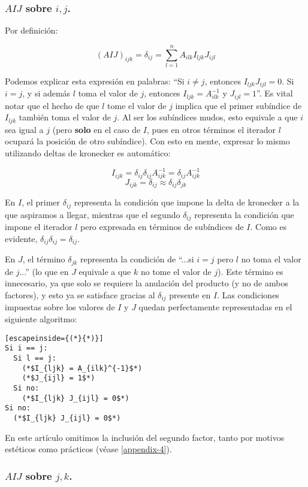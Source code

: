 \subsubsection{$AIJ$ sobre $i, j$.}

Por definición:

$$(AIJ)_{ijk} = \delta_{ij} = \sum\limits^{n}_{l = 1} A_{ilk} I_{ljk} J_{ijl}$$

Podemos explicar esta expresión en palabras: ``Si $i \neq j$, entonces $I_{ljk} J_{ijl} = 0$. Si $i = j$, y si además $l$ toma el valor de $j$, entonces $I_{ljk} = A^{-1}_{ilk}$ y $J_{ijl} = 1$''. Es vital notar que el hecho de que $l$ tome el valor de $j$ implica que el primer subíndice de $I_{ljk}$ también toma el valor de $j$. Al ser los subíndices mudos, esto equivale a que $i$ sea igual a $j$ (pero \textbf{solo} en el caso de $I$, pues en otros términos el iterador $l$ ocupará la posición de otro subíndice). Con esto en mente, expresar lo mismo utilizando deltas de kronecker es automático:

$$I_{ijk} = \delta_{ij} \delta_{ij} A_{ijk}^{-1} = \delta_{ij} A_{ijk}^{-1}$$
$$J_{ijk} = \delta_{ij} \approx \delta_{ij} \delta_{jk}$$

En $I$, el primer $\delta_{ij}$ representa la condición que impone la delta de kronecker a la que aspiramos a llegar, mientras que el segundo $\delta_{ij}$ representa la condición que impone el iterador $l$ pero expresada en términos de subíndices de $I$. Como es evidente, $\delta_{ij} \delta_{ij} = \delta_{ij}$.

En $J$, el término $\delta_{jk}$ representa la condición de ``...si $i = j$ pero $l$ no toma el valor de $j$...'' (lo que en $J$ equivale a que $k$ no tome el valor de $j$). Este término es innecesario, ya que solo se requiere la anulación del producto (y no de ambos factores), y esto ya se satisface gracias al $\delta_{ij}$ presente en $I$. Las condiciones impuestas sobre los valores de $I$ y $J$ quedan perfectamente representadas en el siguiente algoritmo:

\begin{lstlisting}[escapeinside={(*}{*)}]
Si i == j:
  Si l == j:
    (*$I_{ljk} = A_{ilk}^{-1}$*)
    (*$J_{ijl} = 1$*)
  Si no:
    (*$I_{ljk} J_{ijl} = 0$*)
Si no:
  (*$I_{ljk} J_{ijl} = 0$*)	
\end{lstlisting}

En este artículo omitimos la inclusión del segundo factor, tanto por motivos estéticos como prácticos (véase \ref{appendix-4}).

\subsubsection{$AIJ$ sobre $j, k$.}

